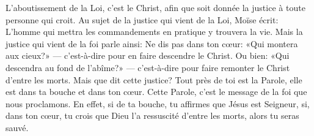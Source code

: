 L’aboutissement de la Loi, c’est le Christ,
	afin que soit donnée la justice à toute personne qui croit.
Au sujet de la justice qui vient de la Loi, Moïse écrit:
	L’homme qui mettra les commandements en pratique y trouvera la vie.
Mais la justice qui vient de la foi parle ainsi:
	Ne dis pas dans ton cœur: «Qui montera aux cieux?»
	--- c’est-à-dire pour en faire descendre le Christ.
Ou bien: «Qui descendra au fond de l’abîme?»
	--- c’est-à-dire pour faire remonter le Christ d’entre les morts.
Mais que dit cette justice?
Tout près de toi est la Parole, elle est dans ta bouche et dans ton cœur.
	Cette Parole, c’est le message de la foi que nous proclamons.
En effet, si de ta bouche, tu affirmes que Jésus est Seigneur,
	si, dans ton cœur, tu crois que Dieu l’a ressuscité d’entre les morts,
	alors tu seras sauvé.
